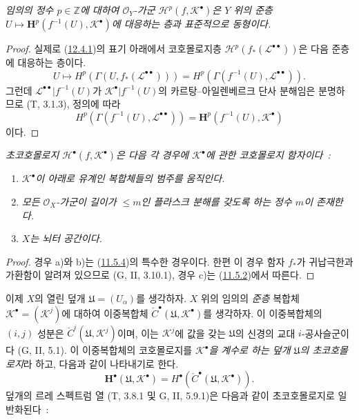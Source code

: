 \begin{proposition}[12.4.3]
\label{0.12.4.3-fr}
\emph{임의의 정수 $p\in\mathbb Z$에 대하여 $\mathcal O_Y$-가군
$\mathcal H^p(f,\mathcal K^\bullet)$은 $Y$ 위의 준층
$U\mapsto\mathbf H^p(f^{-1}(U),\mathcal K^\bullet)$에 대응하는 층과
표준적으로 동형이다.}
\end{proposition}

\begin{proof}
실제로 (\hyperref[0.12.4.1-fr]{12.4.1})의 표기 아래에서 코호몰로지층
$\mathcal H^p(f_*(\mathcal L^{\bullet\bullet}))$은 다음 준층에
대응하는 층이다.
\[
U\longmapsto H^p(\Gamma(U,f_*(\mathcal L^{\bullet\bullet})))
=H^p(\Gamma(f^{-1}(U),\mathcal L^{\bullet\bullet})).
\]
그런데 $\mathcal L^{\bullet\bullet}|f^{-1}(U)$가
$\mathcal K^\bullet|f^{-1}(U)$의 카르탕--아일렌베르크 단사 분해임은
분명하므로 (T, 3.1.3), 정의에 따라
\[
H^p(\Gamma(f^{-1}(U),\mathcal L^{\bullet\bullet}))
=\mathbf H^p(f^{-1}(U),\mathcal K^\bullet)
\]
이다.
\end{proof}

\begin{proposition}[12.4.4]
\label{0.12.4.4-fr}
\emph{초코호몰로지 $\mathcal H^\bullet(f,\mathcal K^\bullet)$은 다음
각 경우에 $\mathcal K^\bullet$에 관한 코호몰로지 함자이다~:}
\begin{enumerate}
\item[\emph{a)}]
\emph{$\mathcal K^\bullet$이 아래로 유계인 복합체들의 범주를 움직인다.}
\item[\emph{b)}]
\emph{모든 $\mathcal O_X$-가군이 길이가 $\leq m$인 플라스크 분해를
갖도록 하는 정수 $m$이 존재한다.}
\item[\emph{c)}]
\emph{$X$는 뇌터 공간이다.}
\end{enumerate}
\end{proposition}

\begin{proof}
경우 a)와 b)는 (\hyperref[0.11.5.4-ko]{11.5.4})의 특수한 경우이다.
한편 이 경우 함자 $f_*$가 귀납극한과 가환함이 알려져 있으므로
(G, II, 3.10.1), 경우 c)는
(\hyperref[0.11.5.2-ko]{11.5.2})에서 따른다.
\end{proof}

\begin{env}[12.4.5]
\label{0.12.4.5-fr}
이제 $X$의 열린 덮개 $\mathfrak U=(U_\alpha)$를 생각하자. $X$ 위의
임의의 \emph{준층} 복합체
$\mathcal K^\bullet=(\mathcal K^j)$에 대하여 이중복합체
$\check C^\bullet(\mathfrak U,\mathcal K^\bullet)$를 생각하자. 이
이중복합체의 $(i,j)$ 성분은
$\check C^i(\mathfrak U,\mathcal K^j)$이며, 이는
$\mathcal K^j$에 값을 갖는 $\mathfrak U$의 신경의 교대
$i$-공사슬군이다 (G, II, 5.1). 이 이중복합체의 코호몰로지를
\emph{$\mathcal K^\bullet$을 계수로 하는 덮개 $\mathfrak U$의
초코호몰로지}라 하고, 다음과 같이 나타내기로 한다.
\[
\mathbf H^\bullet(\mathfrak U,\mathcal K^\bullet)
=H^\bullet(\check C^\bullet(\mathfrak U,\mathcal K^\bullet)).
\]
덮개의 르레 스펙트럼 열 (T, 3.8.1 및 G, II, 5.9.1)은 다음과 같이
초코호몰로지로 일반화된다~:
\end{env}

